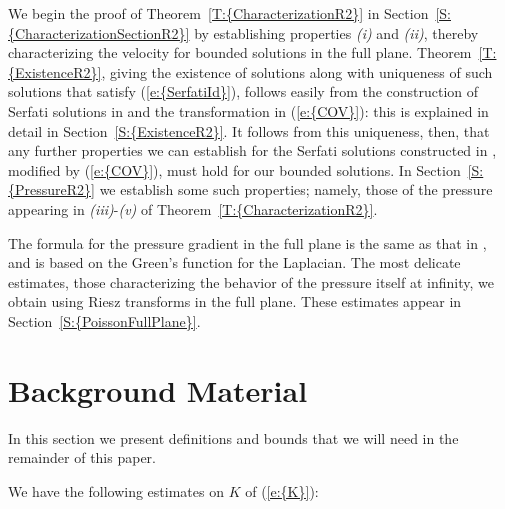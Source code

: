 \documentclass[reqno,openright,11pt,twoside]{amsart}
\theoremstyle{definition}
\numberwithin{equation}{section}
\begin{document}
We begin the proof of {Theorem~\ref{T:{CharacterizationR2}}} in {Section~\ref{S:{CharacterizationSectionR2}}} by establishing properties {\textit{({i})}} and {\textit{({ii})}}, thereby characterizing the velocity for bounded solutions in the full plane. {Theorem~\ref{T:{ExistenceR2}}}, giving the existence of solutions along with uniqueness of such solutions that satisfy {(\ref{e:{SerfatiId}})}, follows easily from the construction of Serfati solutions in \cite{AKLL2014} and the transformation in {(\ref{e:{COV}})}: this is explained in detail in {Section~\ref{S:{ExistenceR2}}}. It follows from this uniqueness, then, that any further properties we can establish for the Serfati solutions constructed in \cite{AKLL2014}, modified by {(\ref{e:{COV}})}, must hold for our bounded solutions. In {Section~\ref{S:{PressureR2}}} we establish some such properties; namely, those of the pressure appearing in {\textit{({iii})}}-{\textit{({v})}} of {Theorem~\ref{T:{CharacterizationR2}}}.

The formula for the pressure gradient in the full plane is the same as that in \cite{Serfati1995B}, and is based on the Green's function for the Laplacian. The most delicate estimates, those characterizing the behavior of the pressure itself at infinity, we obtain using Riesz transforms in the full plane. These estimates appear in {Section~\ref{S:{PoissonFullPlane}}}.

\section{Background Material}\label{S:Background}

\noindent In this section we present definitions and bounds that we will need in the remainder of this paper.

We have the following estimates on $K$ of {(\ref{e:{K}})}:
\end{document}
